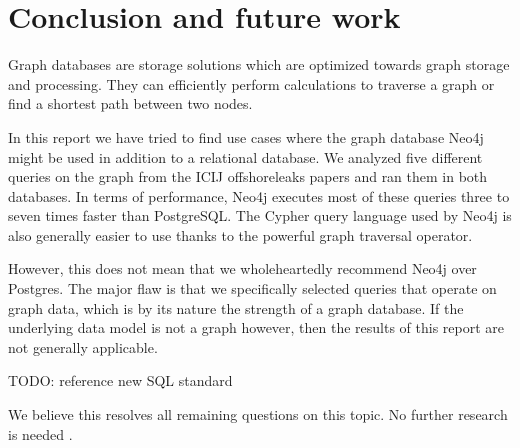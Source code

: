 \documentclass[11pt, a4paper,oneside,chapterprefix=false]{scrbook}
\begin{document}
\chapter{Conclusion and future work} \label{chp:conclusion}

Graph databases are storage solutions which are optimized towards graph storage and processing.
They can efficiently perform calculations to traverse a graph or find a shortest path between two nodes.

In this report we have tried to find use cases where the graph database Neo4j might be used in addition to a relational database.
We analyzed five different queries on the graph from the ICIJ offshoreleaks papers and ran them in both databases.
In terms of performance, Neo4j executes most of these queries three to seven times faster than PostgreSQL.
The Cypher query language used by Neo4j is also generally easier to use thanks to the powerful graph traversal operator.

However, this does not mean that we wholeheartedly recommend Neo4j over Postgres.
The major flaw is that we specifically selected queries that operate on graph data, which is by its nature the strength of a graph database.
If the underlying data model is not a graph however, then the results of this report are not generally applicable.

TODO: reference new SQL standard

We believe this resolves all remaining questions on this topic. No further research is needed \cite{xkcdresearch}.



\end{document}
